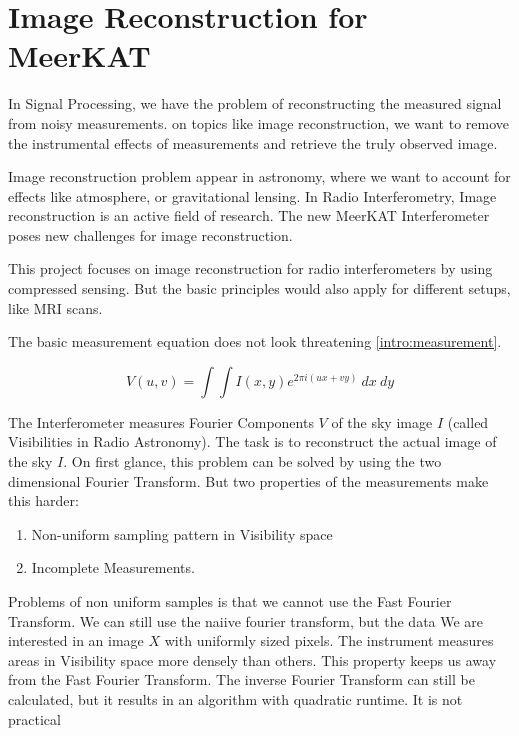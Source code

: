 \section{Image Reconstruction for MeerKAT} \label{intro}

In Signal Processing, we have the problem of reconstructing the measured signal from noisy measurements. on topics like image reconstruction, we want to remove the instrumental effects of measurements and retrieve the truly observed image. 

Image reconstruction problem appear in astronomy, where we want to account for effects like atmosphere, or gravitational lensing. In Radio Interferometry, Image reconstruction is an active field of research. The new MeerKAT Interferometer poses new challenges for image reconstruction. 

This project focuses on image reconstruction for radio interferometers by using compressed sensing. But the basic principles would also apply for different setups, like MRI scans.

The basic measurement equation does not look threatening \eqref{intro:measurement}. 

\begin{equation}\label{intro:measurement}
V(u, v) = \int\int I(x, y) e^{2 \pi i (ux+vy)} \: dx \: dy
\end{equation}

The Interferometer measures Fourier Components $V$ of the sky image $I$ (called Visibilities in Radio Astronomy). The task is to reconstruct the actual image of the sky $I$. On first glance, this problem can be solved by using the two dimensional Fourier Transform. But two properties of the measurements make this harder:
\begin{enumerate}
	\item Non-uniform sampling pattern in Visibility space
	\item Incomplete Measurements. 
\end{enumerate}


Problems of non uniform samples is that we cannot use the Fast Fourier Transform. We can still use the naiive fourier transform, but the data We are interested in an image $X$ with uniformly sized pixels. The instrument measures areas in Visibility space more densely than others. This property keeps us away from the Fast Fourier Transform. The inverse Fourier Transform can still be calculated, but it results in an algorithm with quadratic runtime. It is not practical

